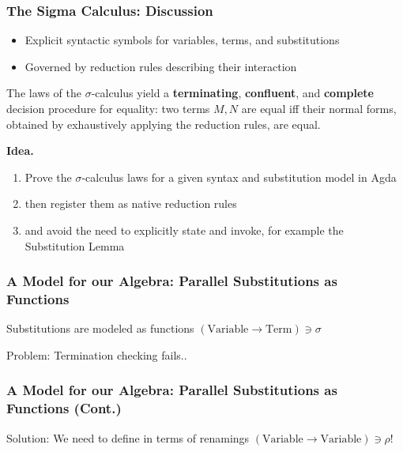 \documentclass[dvipsnames,aspectratio=169,pdftex]{beamer}
\begin{document}
\begin{frame}[fragile]
  \frametitle{The Sigma Calculus: Discussion}
  \begin{itemize}
    \item Explicit syntactic symbols for variables, terms, and substitutions
    \item Governed by reduction rules describing their interaction
  \end{itemize}

  \begin{theorem}
    The laws of the $\sigma$-calculus yield a \textbf{terminating},
    \textbf{confluent}, and \textbf{complete} decision procedure for equality:
    two terms $M, N$ are equal iff their normal forms, obtained by exhaustively
    applying the reduction rules, are equal.
  \end{theorem}

  \vspace{1em}
  \textbf{Idea.}
  \begin{enumerate}
    \item Prove the $\sigma$-calculus laws for a given syntax and substitution model in
          Agda
    \item then register them as native reduction rules
    \item and avoid the need to explicitly state and invoke, for example the Substitution
          Lemma
  \end{enumerate}
\end{frame}

\begin{frame}[fragile]
  \frametitle{A Model for our Algebra: Parallel Substitutions as Functions}
  Substitutions are modeled as functions $(\text{Variable} \to \text{Term}) \ni  \sigma$
  \noindent\begin{minipage}[t]{0.48\linewidth}
    \raggedright{}
    \EXLookUp{}
    \EXId{}
    \EXWk{}
    \EXExt{}
  \end{minipage}
  \hfill
  \begin{minipage}[t]{0.48\linewidth}
    \raggedright{}
    \ESRFail{}
    Problem: Termination checking fails..
  \end{minipage}
\end{frame}

\begin{frame}[fragile]
  \frametitle{A Model for our Algebra: Parallel Substitutions as Functions (Cont.)}
  Solution: We need to define  in terms of renamings $(\text{Variable} \to \text{Variable})\ni \rho$!
  \noindent\begin{minipage}[t]{0.48\linewidth}
    \raggedright{}
    \EYRLookUp{}
    \EYRId{}
    \EYRExt{}
    \EYRWk{}
  \end{minipage}
  \hfill
  \begin{minipage}[t]{0.48\linewidth}
    \raggedright{}
    \EYSCompR{}
    \EYSLift{}
    \EYSTrav{}
  \end{minipage}
\end{frame}
\end{document}
